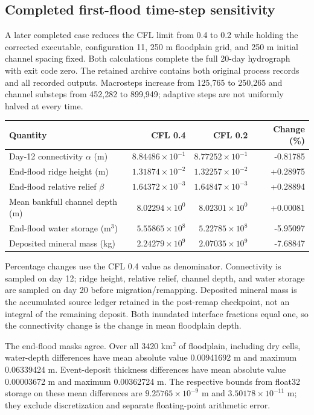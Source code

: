 \subsection{Completed first-flood time-step sensitivity}
A later completed case reduces the CFL limit from 0.4 to 0.2 while
holding the corrected executable, configuration 11, 250 m floodplain
grid, and 250 m initial channel spacing fixed. Both calculations
complete the full 20-day hydrograph with exit code zero. The retained
archive contains both original process records and all recorded
outputs. Macrosteps increase from 125,765 to 250,265 and channel substeps from
452,282 to 899,949; adaptive steps are not uniformly halved at every time.

\begin{center}\small
\begin{tabular}{lrrr}
\toprule
Quantity & CFL 0.4 & CFL 0.2 & Change (\%) \\
\midrule
Day-12 connectivity $\alpha$ (m) & $8.84486\times10^{-1}$ & $8.77252\times10^{-1}$ & -0.81785 \\
End-flood ridge height (m) & $1.31874\times10^{-2}$ & $1.32257\times10^{-2}$ & +0.28975 \\
End-flood relative relief $\beta$ & $1.64372\times10^{-3}$ & $1.64847\times10^{-3}$ & +0.28894 \\
Mean bankfull channel depth (m) & $8.02294\times10^{0}$ & $8.02301\times10^{0}$ & +0.00081 \\
End-flood water storage (m$^3$) & $5.55865\times10^{8}$ & $5.22785\times10^{8}$ & -5.95097 \\
Deposited mineral mass (kg) & $2.24279\times10^{9}$ & $2.07035\times10^{9}$ & -7.68847 \\
\bottomrule\end{tabular}\end{center}
Percentage changes use the CFL 0.4 value as denominator. Connectivity
is sampled on day 12; ridge height, relative relief, channel depth,
and water storage are sampled on day 20 before migration/remapping.
Deposited mineral mass is the accumulated source ledger retained in
the post-remap checkpoint, not an integral of the remaining deposit.
Both inundated interface fractions equal one, so the connectivity
change is the change in mean floodplain depth.

The end-flood masks agree. Over all 3420 km$^2$ of floodplain,
including dry cells, water-depth differences have mean absolute value
0.00941692 m and maximum 0.06339424 m. Event-deposit thickness differences have
mean absolute value 0.00003672 m and maximum 0.00362724 m.
The respective bounds from float32 storage on these mean differences
are $9.25765\times10^{-9}$ m and $3.50178\times10^{-11}$ m; they exclude discretization and separate
floating-point arithmetic error.

